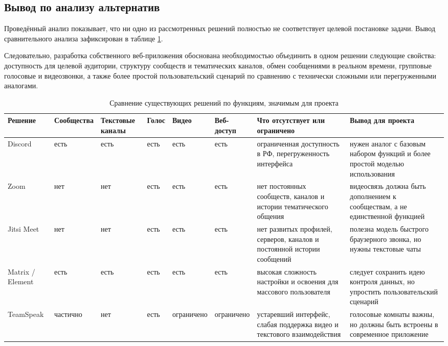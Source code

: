 \documentclass[a4paper,12pt]{extarticle}
\begin{document}
\subsection*{Вывод по анализу альтернатив}

Проведённый анализ показывает, что ни одно из рассмотренных решений полностью не соответствует целевой постановке задачи. Вывод сравнительного анализа зафиксирован в таблице \ref{tab:analysis}.

Следовательно, разработка собственного веб-приложения обоснована необходимостью объединить в одном решении следующие свойства: доступность для целевой аудитории, структуру сообществ и тематических каналов, обмен сообщениями в реальном времени, групповые голосовые и видеозвонки, а также более простой пользовательский сценарий по сравнению с технически сложными или перегруженными аналогами.

\begin{table}
\centering
\small
\renewcommand{\arraystretch}{1.2}
\footnotesize
\begin{tabular}{|p{1.7cm}|p{1.3cm}|p{1.3cm}|p{1.3cm}|p{1.3cm}|p{1.3cm}|p{2.9cm}|p{2.9cm}|}
\hline
\textbf{Решение} & \textbf{Сооб\-щества} & \textbf{Текс\-товые каналы} & \textbf{Голос} & \textbf{Видео} & \textbf{Веб-доступ} & \textbf{Что отсутствует или ограничено} & \textbf{Вывод для проекта} \\
\hline
Discord & есть & есть & есть & есть & есть & ограниченная доступность в РФ, перегруженность интерфейса & нужен аналог с базовым набором функций и более простой моделью использования \\
\hline
Zoom & нет & нет & есть & есть & есть & нет постоянных сообществ, каналов и истории тематического общения & видеосвязь должна быть дополнением к сообществам, а не единственной функцией \\
\hline
Jitsi Meet & нет & нет & есть & есть & есть & нет развитых профилей, серверов, каналов и постоянной истории сообщений & полезна модель быстрого браузерного звонка, но нужны текстовые чаты \\
\hline
Matrix / Element & есть & есть & есть & есть & есть & высокая сложность настройки и освоения для массового пользователя & следует сохранить идею контроля данных, но упростить пользовательский сценарий \\
\hline
TeamSpeak & частично & нет & есть & ограни\-чено & ограни\-чено & устаревший интерфейс, слабая поддержка видео и текстового взаимодействия & голосовые комнаты важны, но должны быть встроены в современное приложение \\
\hline
\end{tabular}
\caption{Сравнение существующих решений по функциям, значимым для проекта}
\label{tab:analysis}
\end{table}
\end{document}

